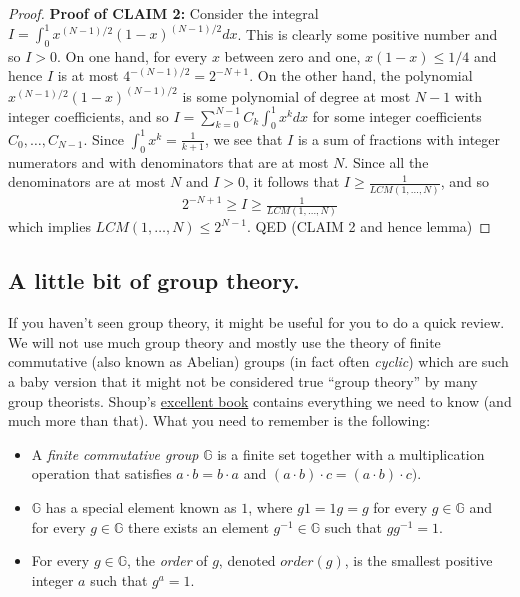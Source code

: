 \begin{proof}
\textbf{Proof of CLAIM 2:} Consider the integral
\(I=\int_0^1 x^{(N-1)/2}(1-x)^{(N-1)/2} dx\). This is clearly some
positive number and so \(I>0\). On one hand, for every \(x\) between
zero and one, \(x(1-x) \leq 1/4\) and hence \(I\) is at most
\(4^{-(N-1)/2}=2^{-N+1}\). On the other hand, the polynomial
\(x^{(N-1)/2}(1-x)^{(N-1)/2}\) is some polynomial of degree at most
\(N-1\) with integer coefficients, and so
\(I=\sum_{k=0}^{N-1} C_k \int_0^1 x^k dx\) for some integer coefficients
\(C_0,\ldots,C_{N-1}\). Since \(\int_0^1 x^k = \tfrac{1}{k+1}\), we see
that \(I\) is a sum of fractions with integer numerators and with
denominators that are at most \(N\). Since all the denominators are at
most \(N\) and \(I>0\), it follows that
\(I \geq \tfrac{1}{LCM(1,\ldots,N)}\), and so
\begin{equation*}
2^{-N+1} \geq I \geq \tfrac{1}{LCM(1,\ldots,N)}
\end{equation*}
which implies \(\ensuremath{\mathit{LCM}}(1,\ldots,N) \leq 2^{N-1}\).
QED (CLAIM 2 and hence lemma)

\end{proof}

\subsection{A little bit of group
theory.}\label{10-A-little-bit-of-group-}

If you haven't seen group theory, it might be useful for you to do a
quick review. We will not use much group theory and mostly use the
theory of finite commutative (also known as Abelian) groups (in fact
often \emph{cyclic}) which are such a baby version that it might not be
considered true ``group theory'' by many group theorists. Shoup's
\href{http://www.shoup.net/ntb/}{excellent book} contains everything we
need to know (and much more than that). What you need to remember is the
following:

\begin{itemize}
\item
  A \emph{finite commutative group} \(\mathbb{G}\) is a finite set
  together with a multiplication operation that satisfies
  \(a\cdot b = b\cdot a\) and
  \((a\cdot b)\cdot c = (a\cdot b)\cdot c)\).
\item
  \(\mathbb{G}\) has a special element known as \(1\), where \(g1=1g=g\)
  for every \(g\in\mathbb{G}\) and for every \(g\in \mathbb{G}\) there
  exists an element \(g^{-1}\in \mathbb{G}\) such that \(gg^{-1}=1\).
\item
  For every \(g\in \mathbb{G}\), the \emph{order} of \(g\), denoted
  \(order(g)\), is the smallest positive integer \(a\) such that
  \(g^a=1\).
\end{itemize}

